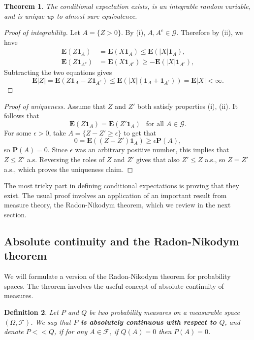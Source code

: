 \documentclass[12pt]{article}
\newtheorem{thm}{Theorem}[section]
\newtheorem{defi}[thm]{Definition}
\newcommand{\prob}{\mathbf{P}}
\newcommand{\expec}{\mathbf{E}}
\newcommand{\ind}{\textbf{1}}
\theoremstyle{example}
\begin{document}
\begin{thm} \label{thm-cond-ext}
The conditional expectation exists, is an integrable random variable, and is unique up to almost sure equivalence.
\end{thm}

\begin{proof}[Proof of integrability]
Let $A = \{ Z>0 \}$. By (i), $A, A^c \in \mathcal{G}$. Therefore by (ii), we have
\begin{align*}
\expec(Z \ind_A) &= \expec(X \ind_A) \le \expec\left( |X| \ind_A \right), \\
\expec(Z \ind_{A^c}) &= \expec(X \ind_{A^c}) \ge -\expec\left( |X| \ind_{A^c} \right),
\end{align*}
Subtracting the two equations gives
$$ \expec|Z| = \expec(Z\ind_A - Z\ind_{A^c}) \le \expec\left( |X| (\ind_A + \ind_{A^c}) \right) = \expec|X| < \infty.
$$
\end{proof}

\begin{proof}[Proof of uniqueness] Assume that $Z$ and $Z'$ both satisfy properties (i), (ii). It follows that
$$ \expec(Z \ind_A) = \expec(Z' \ind_A)\ \  \textrm{ for all }A \in \mathcal{G}. $$
For some $\epsilon>0$, take $A = \{ Z-Z' \ge \epsilon \}$ to get that
$$ 0 = \expec( (Z-Z')\ind_A ) \ge \epsilon \prob(A), $$
so $\prob(A) = 0$. Since $\epsilon$ was an arbitrary positive number, this implies that $Z\le Z'$ a.s. Reversing the roles of $Z$ and $Z'$ gives that also $Z'\le Z$ a.s., so $Z=Z'$ a.s., which proves the uniqueness claim.
\end{proof}

The most tricky part in defining conditional expectations is proving that they exist. The usual proof involves an application of an important result from measure theory, the Radon-Nikodym theorem, which we review in the next section.


\subsection{Absolute continuity and the Radon-Nikodym theorem}

We will formulate a version of the Radon-Nikodym theorem for probability spaces. The theorem involves the useful concept of absolute continuity of measures.

\begin{defi}
Let $P$ and $Q$ be two probability measures on a measurable space $(\Omega, \mathcal{F})$. We say that \textbf{$P$ is absolutely continuous with respect to $Q$}, and denote $P<<Q$, if for any $A\in\mathcal{F}$, if $Q(A)=0$ then $P(A)=0$.
\end{defi}
\end{document}
